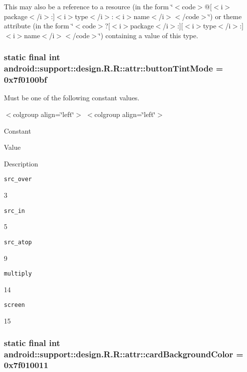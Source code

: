 This may also be a reference to a resource (in the form \char`\"{}$<$code$>$@\mbox{[}$<$i$>$package$<$/i$>$:\mbox{]}$<$i$>$type$<$/i$>$:$<$i$>$name$<$/i$>$$<$/code$>$\char`\"{}) or theme attribute (in the form \char`\"{}$<$code$>$?\mbox{[}$<$i$>$package$<$/i$>$:\mbox{]}\mbox{[}$<$i$>$type$<$/i$>$:\mbox{]}$<$i$>$name$<$/i$>$$<$/code$>$\char`\"{}) containing a value of this type. \hypertarget{classandroid_1_1support_1_1design_1_1_r_1_1attr_8181946b8554e02a32c5c31470f131a5}{
\subsubsection[{buttonTintMode}]{\setlength{\rightskip}{0pt plus 5cm}static final int android::support::design.R.R::attr::buttonTintMode = 0x7f0100bf}}
\label{classandroid_1_1support_1_1design_1_1_r_1_1attr_8181946b8554e02a32c5c31470f131a5}


Must be one of the following constant values. \begin{TabularC}{0}
\hline
\end{TabularC}
$<$colgroup align=\char`\"{}left\char`\"{}$>$ $<$colgroup align=\char`\"{}left\char`\"{}$>$ 

Constant

Value

Description 

{\tt src\_\-over}

3

{\tt src\_\-in}

5

{\tt src\_\-atop}

9

{\tt multiply}

14

{\tt screen}

15\hypertarget{classandroid_1_1support_1_1design_1_1_r_1_1attr_375a3e2271d4491d3b0c5321ebc77739}{
\subsubsection[{cardBackgroundColor}]{\setlength{\rightskip}{0pt plus 5cm}static final int android::support::design.R.R::attr::cardBackgroundColor = 0x7f010011}}
\label{classandroid_1_1support_1_1design_1_1_r_1_1attr_375a3e2271d4491d3b0c5321ebc77739}


